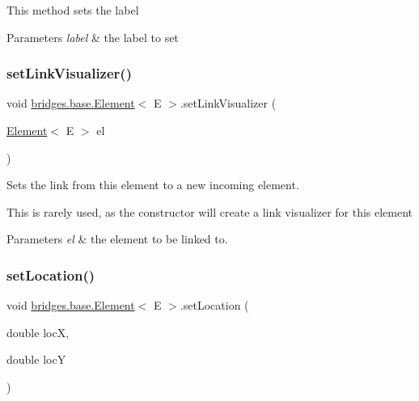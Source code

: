 This method sets the label


\begin{DoxyParams}{Parameters}
{\em label} & the label to set \\
\hline
\end{DoxyParams}
\mbox{\label{classbridges_1_1base_1_1_element_af6251f52b9d277dd77e3bab1829d0197}} 
\subsubsection{\texorpdfstring{set\+Link\+Visualizer()}{setLinkVisualizer()}}
{\footnotesize\ttfamily void \hyperlink{classbridges_1_1base_1_1_element}{bridges.\+base.\+Element}$<$ E $>$.set\+Link\+Visualizer (\begin{DoxyParamCaption}\item[{\hyperlink{classbridges_1_1base_1_1_element}{Element}$<$ E $>$}]{el }\end{DoxyParamCaption})\hspace{0.3cm}{\ttfamily [protected]}}



Sets the link from this element to a new incoming element. 

This is rarely used, as the constructor will create a link visualizer for this element


\begin{DoxyParams}{Parameters}
{\em el} & the element to be linked to. \\
\hline
\end{DoxyParams}
\mbox{\label{classbridges_1_1base_1_1_element_a0fe9a52d06e8f3ccc8521e155ec72a27}} 
\subsubsection{\texorpdfstring{set\+Location()}{setLocation()}}
{\footnotesize\ttfamily void \hyperlink{classbridges_1_1base_1_1_element}{bridges.\+base.\+Element}$<$ E $>$.set\+Location (\begin{DoxyParamCaption}\item[{double}]{locX,  }\item[{double}]{locY }\end{DoxyParamCaption})}



